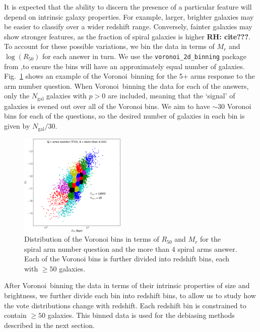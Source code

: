 \documentclass[useAMS,usenatbib]{mn2e}
\newcommand{\rh}[1]{{\bf \textcolor{RoyalPurple}{RH: #1}}}
\begin{document}
It is expected that the ability to discern the presence of a particular feature will depend on intrinsic galaxy properties.  For example, larger, brighter galaxies may be easier to classify over a wider redshift range. Conversely, fainter galaxies may show stronger features, as the fraction of spiral galaxies is higher \rh{cite???}. To account for these possible variations, we bin the data in terms of $M_r$ and $\log(R_{50})$ for each answer in turn. We use the \texttt{voronoi\_2d\_binning} package from \cite{Cappellari_03},to ensure the bins will have an approximately equal number of galaxies. Fig.~\ref{fig:voronoi_bins} shows an example of the Voronoi~binning for the 5+ arms response to the arm number question. When Voronoi~binning the data for each of the answers, only the $N_{\mathrm{gal}}$ galaxies with $p>0$ are included, meaning that the `signal' of galaxies is evened out over all of the Voronoi bins. We aim to have $\sim 30$ Voronoi bins for each of the questions, so the desired number of galaxies in each bin is given by $N_{\mathrm{gal}}/30$.

\begin{figure}
		\centering

        \includegraphics[width=0.45\textwidth]{Images/Bias/Debiasing/voronoi_bins.pdf}

        \caption{Distribution of the Voronoi bins in terms of $R_{50}$ and $M_r$ for the spiral arm number question and the more than 4 spiral arms answer. Each of the Voronoi bins is further divided into redshift bins, each with $\geq 50$ galaxies.}

        \label{fig:voronoi_bins}

\end{figure}

After Voronoi~binning the data in terms of their intrinsic properties of size and brightness, we further divide each bin into redshift bins, to allow us to study how the vote distributions change with redshift. Each redshift bin is constrained to contain $\geq 50$ galaxies. This binned data is used for the debiasing methods described in the next section.
\end{document}
